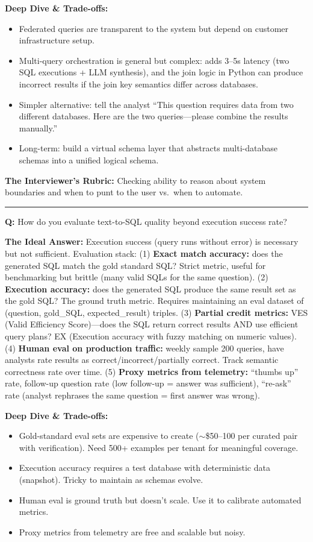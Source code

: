\textbf{Deep Dive \& Trade-offs:}
\begin{itemize}
  \item Federated queries are transparent to the system but depend on customer infrastructure setup.
  \item Multi-query orchestration is general but complex: adds 3--5s latency (two SQL executions + LLM synthesis), and the join logic in Python can produce incorrect results if the join key semantics differ across databases.
  \item Simpler alternative: tell the analyst ``This question requires data from two different databases. Here are the two queries---please combine the results manually.''
  \item Long-term: build a virtual schema layer that abstracts multi-database schemas into a unified logical schema.
\end{itemize}

\textbf{The Interviewer's Rubric:} Checking ability to reason about system boundaries and when to punt to the user vs.\ when to automate.

\bigskip\hrule\bigskip

\textbf{Q:} How do you evaluate text-to-SQL quality beyond execution success rate?

\textbf{The Ideal Answer:} Execution success (query runs without error) is necessary but not sufficient. Evaluation stack: (1) \textbf{Exact match accuracy:} does the generated SQL match the gold standard SQL? Strict metric, useful for benchmarking but brittle (many valid SQLs for the same question). (2) \textbf{Execution accuracy:} does the generated SQL produce the same result set as the gold SQL? The ground truth metric. Requires maintaining an eval dataset of (question, gold\_SQL, expected\_result) triples. (3) \textbf{Partial credit metrics:} VES (Valid Efficiency Score)---does the SQL return correct results AND use efficient query plans? EX (Execution accuracy with fuzzy matching on numeric values). (4) \textbf{Human eval on production traffic:} weekly sample 200 queries, have analysts rate results as correct/incorrect/partially correct. Track semantic correctness rate over time. (5) \textbf{Proxy metrics from telemetry:} ``thumbs up'' rate, follow-up question rate (low follow-up = answer was sufficient), ``re-ask'' rate (analyst rephrases the same question = first answer was wrong).

\textbf{Deep Dive \& Trade-offs:}
\begin{itemize}
  \item Gold-standard eval sets are expensive to create ($\sim$\$50--100 per curated pair with verification). Need 500+ examples per tenant for meaningful coverage.
  \item Execution accuracy requires a test database with deterministic data (snapshot). Tricky to maintain as schemas evolve.
  \item Human eval is ground truth but doesn't scale. Use it to calibrate automated metrics.
  \item Proxy metrics from telemetry are free and scalable but noisy.
\end{itemize}

